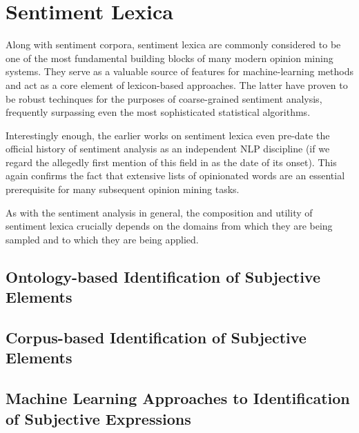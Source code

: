 

\section{Sentiment Lexica}\label{sec:snt:lex}

Along with sentiment corpora, sentiment lexica are commonly considered
to be one of the most fundamental building blocks of many modern
opinion mining systems.  They serve as a valuable source of features
for machine-learning methods and act as a core element of
lexicon-based approaches.  The latter have proven to be robust
techinques for the purposes of coarse-grained sentiment analysis,
frequently surpassing even the most sophisticated statistical
algorithms.

Interestingly enough, the earlier works on sentiment lexica
\cite{Stone:66,Hatzivassi:97,Hatzivassi:00} even pre-date the official
history of sentiment analysis as an independent NLP discipline (if we
regard the allegedly first mention of this field in
\citet{Nasukawa:03} as the date of its onset).  This again confirms
the fact that extensive lists of opinionated words are an essential
prerequisite for many subsequent opinion mining tasks.

As with the sentiment analysis in general, the composition and utility
of sentiment lexica crucially depends on the domains from which they
are being sampled and to which they are being applied.

\subsection{Ontology-based Identification of Subjective Elements}
\subsection{Corpus-based Identification of Subjective Elements}
\subsection{Machine Learning Approaches to Identification of Subjective Expressions}

